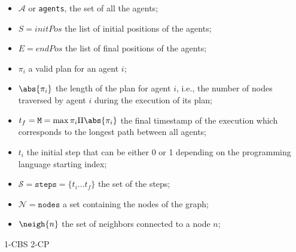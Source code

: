 \begin{itemize}
  \item $\mathcal{A}$ or \texttt{agents}, the set of all the agents;
  \item $S=initPos$ the list of initial positions of the agents;
  \item $E=endPos$ the list of final positions of the agents;
  \item $\pi_i$ a valid plan for an agent $i$;
  \item $\abs{\pi_i}$ the length of the plan for agent $i$, i.e., the number
    of nodes traversed by agent $i$ during the execution of its plan;
  \item $t_f= \texttt{M}= \max\limits{\pi_i\Pi}\abs{\pi_i}$ the final timestamp
    of the execution which corresponds to the longest path between all agents;
  \item $t_i$ the initial step that can be either 0 or 1 depending on the
    programming language starting index;
  \item $\mathcal{S}=\texttt{steps}=\{t_i...t_f\}$ the set of the steps; 
  \item $\mathcal{N}=\texttt{nodes}$ a set containing the nodes of the graph;
  \item $\neigh{n}$ the set of neighbors connected to a node $n$;
\end{itemize}
%
%
%
{1-CBS}
{2-CP}

